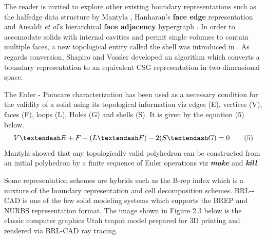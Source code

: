 \hspace{30} The   reader   is   invited   to   explore   other   existing   boundary   representations  
such   as   the   half­edge   data   structure   by   Mantyla   \cite{19},   Hanharan's   \textbf{face ­edge}  
representation   \cite{20}   and   Ansaldi   \textit {et al}'s   hierarchical   \textbf{face   adjacency}   hypergraph  
\cite{21}.   In   order   to   accomodate   solids   with   internal   cavities   and   permit   single  
volumes   to   contain   multiple   faces,   a   new   topological   entity   called   the   shell   was  
introduced   in   \cite{21}.   As   regards   conversion,   Shapiro   and   Vossler   \cite{22}   developed  
an   algorithm   which   converts   a   boundary   representation   to   an   equivalent   CSG  
representation in two-­dimensional space.

\hspace{30} The   Euler - ­Poincare   characterization   has   been   used   as   a   necessary  
condition   for   the   validity   of   a   solid   using   its   topological   information   viz   edges  
(E),   vertices   (V),   faces   (F),   loops   (L),   Holes   (G)   and   shells   (S).   It   is   given   by   the  
equation (5) below.
\begin{equation*}
\centering
 V – E + F -­ ( L – F ) - 2(S – G ) = 0 ­­­­­­­­­­­­­­ \tag{5}
\end{equation*}
Mantyla   showed   that   any   topologically   valid   polyhedron   can   be   constructed  
from   an   initial   polyhedron   by   a   finite   sequence   of   Euler   operations   viz   \textit{\textbf{make}}  
and \textit{\textbf{kill}}.

\hspace{30} Some   representation   schemes   are   hybrids   such   as   the   B-­rep   index   which  
is   a   mixture   of   the   boundary   representation   and   cell   decomposition   schemes.  
BRL-­CAD   is   one   of   the   few   solid   modeling   systems   which   supports   the  
BREP and NURBS   representation   format.  The   image   shown   in   Figure   2.3   below   is   the   classic   computer   graphics   Utah  teapot model prepared for 3D printing and rendered via BRL-­CAD ray tracing.\\

